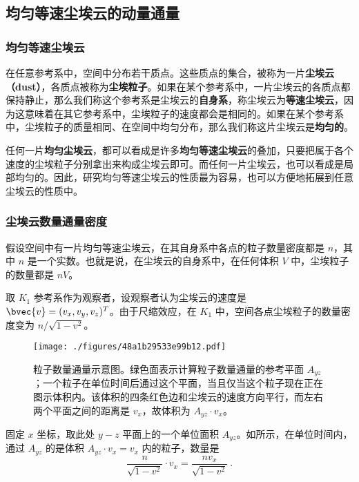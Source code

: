 



\subsection{均匀等速尘埃云的动量通量}

\subsubsection{均匀等速尘埃云}

在任意参考系中，空间中分布若干质点。这些质点的集合，被称为一片\textbf{尘埃云（dust）}，各质点被称为\textbf{尘埃粒子}。如果在某个参考系中，一片尘埃云的各质点都保持静止，那么我们称这个参考系是尘埃云的\textbf{自身系}，称尘埃云为\textbf{等速尘埃云}，因为这意味着在其它参考系中，尘埃粒子的速度都会是相同的。如果在某个参考系中，尘埃粒子的质量相同、在空间中均匀分布，那么我们称这片尘埃云是\textbf{均匀的}。

任何一片\textbf{均匀尘埃云}，都可以看成是许多\textbf{均匀等速尘埃云}的叠加，只要把属于各个速度的尘埃粒子分别拿出来构成尘埃云即可。而任何一片尘埃云，也可以看成是局部均匀的。因此，研究均匀等速尘埃云的性质最为容易，也可以方便地拓展到任意尘埃云的性质中。

\subsubsection{尘埃云数量通量密度}

假设空间中有一片均匀等速尘埃云，在其自身系中各点的粒子数量密度都是 $n$，其中 $n$ 是一个实数。也就是说，在尘埃云的自身系中，在任何体积 $V$ 中，尘埃粒子的数量都是 $nV$。

取 $K_1$ 参考系作为观察者，设观察者认为尘埃云的速度是 $\bvec{v}=(v_x, v_y, v_z)^T$。由于尺缩效应，在 $K_1$ 中，空间各点尘埃粒子的数量密度变为 $n/\sqrt{1-v^2}$。

\begin{figure}[ht]
\centering
\texttt{[image: ./figures/48a1b29533e99b12.pdf]}
\caption{粒子数量通量示意图。绿色面表示计算粒子数量通量的参考平面 $A_{yz}$；一个粒子在单位时间后通过这个平面，当且仅当这个粒子现在正在图示体积内。该体积的四条红色边和尘埃云的速度方向平行，而左右两个平面之间的距离是 $v_x$，故体积为 $A_{yz}\cdot v_x$。} \label{fig_SRFld_1}
\end{figure}

固定 $x$ 坐标，取此处 $y-z$ 平面上的一个单位面积 $A_{yz}$。如所示，在单位时间内，通过 $A_{yz}$ 的是体积 $A_{yz}\cdot v_x=v_x$ 内的粒子，数量是
\begin{equation}
\frac{n}{\sqrt{1-v^2}}\cdot v_x=\frac{nv_x}{\sqrt{1-v^2}}~.
\end{equation}

